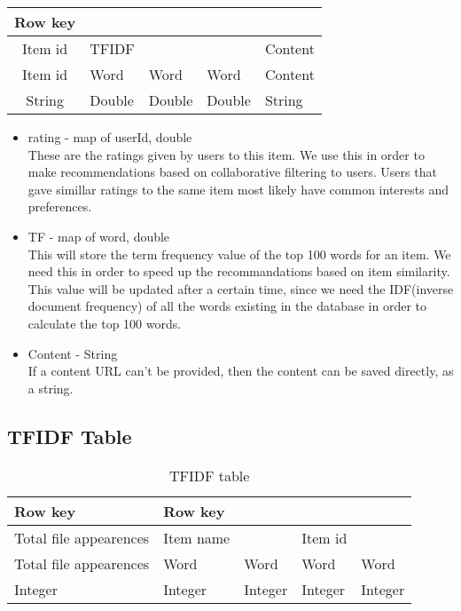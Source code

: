 \begin{table}[!h]
\centering
\label{item-tabel-format-three}
\begin{tabular}{@{}cllll@{}}
Row key &  &  &  &  \\ \toprule
Item id & \multicolumn{1}{l}{TFIDF} & \multicolumn{1}{l}{} & \multicolumn{1}{l}{} & \multicolumn{1}{l}{Content} \\ 
Item id & \multicolumn{1}{l}{Word} & \multicolumn{1}{l}{Word} & \multicolumn{1}{l}{Word} & \multicolumn{1}{l}{Content} \\ 
String & \multicolumn{1}{l}{Double} & \multicolumn{1}{l}{Double} & \multicolumn{1}{l}{Double} & \multicolumn{1}{l}{String} \\ 
\end{tabular}
\end{table}

\begin{itemize}
	\item rating - map of userId, double
		\\ These are the ratings given by users to this item.
		We use this in order to make recommendations based on collaborative filtering to users.
		Users that gave simillar ratings to the same item most likely have common interests and preferences.
	\item TF - map of word, double
		\\ This will store the term frequency value of the top 100 words for an item.
		We need this in order to speed up the recommandations based on item similarity.
		This value will be updated after a certain time, since we need the IDF(inverse document frequency) of all the words existing in the database in order to calculate the top 100 words.
	\item Content - String
		\\ If a content URL can't be provided, then the content can be saved directly, as a string. 
\end{itemize}

\subsection{TFIDF Table}
\label{sec:tfidf-table}

\begin{table}[!htbp]
\centering
\caption{TFIDF table }
\label{TFIDF-table}
\begin{tabular}{lllll}

\multicolumn{1}{l}{Row key} & \multicolumn{1}{l}{Row key} & \multicolumn{1}{l}{} & \multicolumn{1}{l}{} & \multicolumn{1}{l}{} \\ \toprule
Total file appearences        & Item name                    &                       & Item id               &                       \\
Total file appearences        & Word                         & Word                  & Word                  & Word                  \\
Integer                       & Integer                      & Integer               & Integer               & Integer              
\end{tabular}
\end{table}

